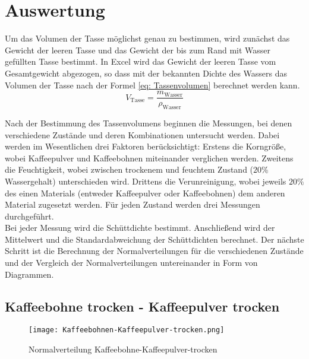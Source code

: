 \chapter{Auswertung}
\label{sec: Hauptkapitel 3}
Um das Volumen der Tasse möglichst genau zu bestimmen, wird zunächst das Gewicht der leeren Tasse und das Gewicht der bis zum Rand 
mit Wasser gefüllten Tasse bestimmt. 
In Excel wird das Gewicht der leeren Tasse vom Gesamtgewicht abgezogen, so dass mit der bekannten Dichte des Wassers das 
Volumen der Tasse nach der Formel \ref{eq: Tassenvolumen} berechnet werden kann.
\\

\begin{equation}
    V_{\text{Tasse}} = \frac{m_{\text{Wasser}}}{\rho_{\text{Wasser}}}
    \label{eq: Tassenvolumen}
\end{equation}


\noindent
Nach der Bestimmung des Tassenvolumens beginnen die Messungen, bei denen verschiedene Zustände und deren Kombinationen untersucht 
werden. 
Dabei werden im Wesentlichen drei Faktoren berücksichtigt: Erstens die Korngröße, wobei Kaffeepulver und Kaffeebohnen miteinander 
verglichen werden. 
Zweitens die Feuchtigkeit, wobei zwischen trockenem und feuchtem Zustand ($20\%$ Wassergehalt) unterschieden wird. 
Drittens die Verunreinigung, wobei jeweils $20\%$ des einen Materials (entweder Kaffeepulver oder Kaffeebohnen) dem anderen 
Material zugesetzt werden. 
Für jeden Zustand werden drei Messungen durchgeführt.
\\


\noindent
Bei jeder Messung wird die Schüttdichte bestimmt. Anschließend wird der Mittelwert und die Standardabweichung der Schüttdichten 
berechnet.
Der nächste Schritt ist die Berechnung der Normalverteilungen für die verschiedenen Zustände und der Vergleich der 
Normalverteilungen untereinander in Form von Diagrammen.

\section{Kaffeebohne trocken - Kaffeepulver trocken}
    \begin{figure}[H]
        \centering
        \texttt{[image: Kaffeebohnen-Kaffeepulver-trocken.png]}
        \caption{Normalverteilung Kaffeebohne-Kaffeepulver-trocken}
        \label{fig: Norm.trocken}
    \end{figure}

